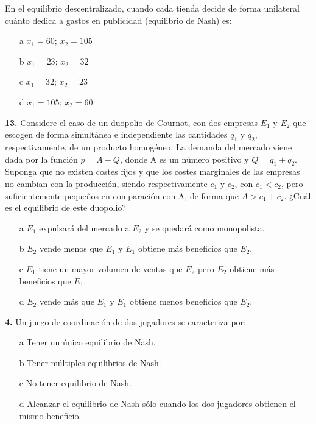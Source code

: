 \documentclass{nuevotema}
\begin{document}
En el equilibrio descentralizado, cuando cada tienda decide de forma unilateral cuánto dedica a gastos en publicidad (equilibrio de Nash) es:

\begin{itemize}
	\item[a] $x_1 = 60$; $x_2 =105$
	\item[b] $x_1 = 23$; $x_2 = 32$
	\item[c] $x_1 = 32$; $x_2 =23$
	\item[d] $x_1 = 105$; $x_2 = 60$
\end{itemize}

\textbf{13.} Considere el caso de un duopolio de Cournot, con dos empresas $E_1$ y $E_2$ que escogen de forma simultánea e independiente las cantidades $q_1$ y $q_2$, respectivamente, de un producto homogéneo. La demanda del mercado viene dada por la función $p=A-Q$, donde A es un número positivo y $Q = q_1 + q_2$. Suponga que no existen costes fijos y que los costes marginales de las empresas no cambian con la producción, siendo respectivamente $c_1$ y $c_2$, con $c_1 < c_2$, pero suficientemente pequeños en comparación con A, de forma que $A > c_1 + c_2$. ¿Cuál es el equilibrio de este duopolio?

\begin{itemize}
	\item[a] $E_1$ expulsará del mercado a $E_2$ y se quedará como monopolista.
	\item[b] $E_2$ vende menos que $E_1$ y $E_1$ obtiene más beneficios que $E_2$.
	\item[c] $E_1$ tiene un mayor volumen de ventas que $E_2$ pero $E_2$ obtiene más beneficios que $E_1$. 
	\item[d] $E_2$ vende más que $E_1$ y $E_1$ obtiene menos beneficios que $E_2$.
\end{itemize}



\textbf{4.} Un juego de coordinación de dos jugadores se caracteriza por:
\begin{enumerate}
	\item[a] Tener un único equilibrio de Nash.
	\item[b] Tener múltiples equilibrios de Nash.
	\item[c] No tener equilibrio de Nash.
	\item[d] Alcanzar el equilibrio de Nash sólo cuando los dos jugadores obtienen el mismo beneficio.
\end{enumerate}
\end{document}
